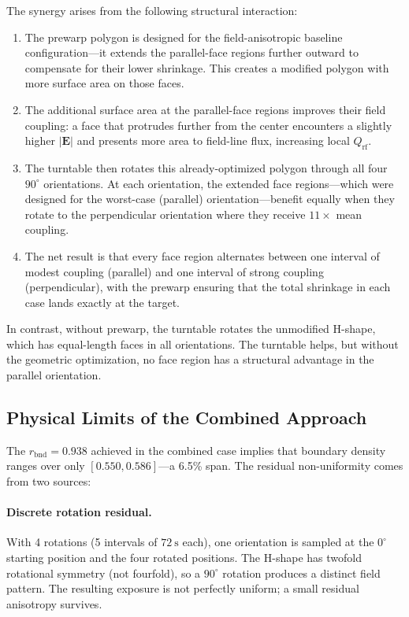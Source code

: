 \documentclass[5p,times]{elsarticle}
\newcommand{\Qrf}{Q_{\mathrm{rf}}}
\newcommand{\vect}[1]{\boldsymbol{#1}}
\begin{document}
The synergy arises from the following structural interaction:
\begin{enumerate}
  \item The prewarp polygon is designed for the field-anisotropic
        baseline configuration---it extends the parallel-face regions
        further outward to compensate for their lower shrinkage.  This
        creates a modified polygon with more surface area on those faces.
  \item The additional surface area at the parallel-face regions
        improves their field coupling: a face that protrudes further
        from the center encounters a slightly higher $|\vect{E}|$ and
        presents more area to field-line flux, increasing local $\Qrf$.
  \item The turntable then rotates this already-optimized polygon through
        all four $90^\circ$ orientations.  At each orientation, the
        extended face regions---which were designed for the worst-case
        (parallel) orientation---benefit equally when they rotate to
        the perpendicular orientation where they receive $11\times$
        mean coupling.
  \item The net result is that every face region alternates between
        one interval of modest coupling (parallel) and one interval of
        strong coupling (perpendicular), with the prewarp ensuring that
        the total shrinkage in each case lands exactly at the target.
\end{enumerate}
In contrast, without prewarp, the turntable rotates the unmodified
H-shape, which has equal-length faces in all orientations.  The
turntable helps, but without the geometric optimization, no face region
has a structural advantage in the parallel orientation.

\subsection{Physical Limits of the Combined Approach}

The $r_{\mathrm{bnd}} = 0.938$ achieved in the combined case implies
that boundary density ranges over only $[0.550, 0.586]$---a 6.5\% span.
The residual non-uniformity comes from two sources:

\paragraph{Discrete rotation residual.}
With 4 rotations (5 intervals of $\SI{72}{\second}$ each), one
orientation is sampled at the $0^\circ$ starting position and the
four rotated positions.  The H-shape has twofold rotational symmetry
(not fourfold), so a $90^\circ$ rotation produces a distinct field
pattern.  The resulting exposure is not perfectly uniform; a small
residual anisotropy survives.
\end{document}
